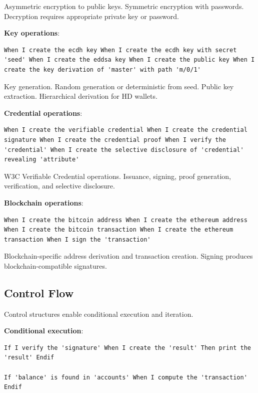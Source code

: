 Asymmetric encryption to public keys. Symmetric encryption with
passwords. Decryption requires appropriate private key or password.

\textbf{Key operations}:

\begin{verbatim}
When I create the ecdh key When I create the ecdh key with secret
'seed' When I create the eddsa key When I create the public key When I
create the key derivation of 'master' with path 'm/0/1'
\end{verbatim}

Key generation. Random generation or deterministic from seed. Public
key extraction. Hierarchical derivation for HD wallets.

\textbf{Credential operations}:

\begin{verbatim}
When I create the verifiable credential When I create the credential
signature When I create the credential proof When I verify the
'credential' When I create the selective disclosure of 'credential'
revealing 'attribute'
\end{verbatim}

W3C Verifiable Credential operations. Issuance, signing, proof
generation, verification, and selective disclosure.

\textbf{Blockchain operations}:

\begin{verbatim}
When I create the bitcoin address When I create the ethereum address
When I create the bitcoin transaction When I create the ethereum
transaction When I sign the 'transaction'
\end{verbatim}

Blockchain-specific address derivation and transaction
creation. Signing produces blockchain-compatible signatures.

\subsection{Control Flow}

Control structures enable conditional execution and iteration.

\textbf{Conditional execution}:

\begin{verbatim}
If I verify the 'signature' When I create the 'result' Then print the
'result' Endif

If 'balance' is found in 'accounts' When I compute the 'transaction'
Endif
\end{verbatim}

